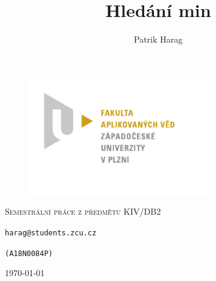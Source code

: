 \documentclass[12pt, a4paper]{article}
\title{Hledání min}
\author{Patrik Harag}
\makeatletter
\def \thesubtitle {Semestrální práce z předmětu KIV/DB2}
\def \theauthoremail {harag@students.zcu.cz}
\def \theauthorid {(A18N0084P)}
\makeatother
\begin{document}
\begin{titlepage}
	\begin{figure}
		\includegraphics[height=50mm]{img-fav-logo}
	\end{figure}
	
	\centering
	{\large \hspace{1mm} \par} %
	\vspace{15ex}
	
	{\scshape\Large \thesubtitle \par}
	\vspace{1.5ex}
	{\huge\bfseries \thetitle \par}
	\vspace{2ex}
	{\Large\itshape \theauthor \par}
	\vspace{2ex}
	{\texttt{\theauthoremail} \par}
	\vspace{1ex}
	{\texttt{\theauthorid} \par}
	
	\vfill

	{\today\par}
\end{titlepage}

\tableofcontents
\newpage
\end{document}

